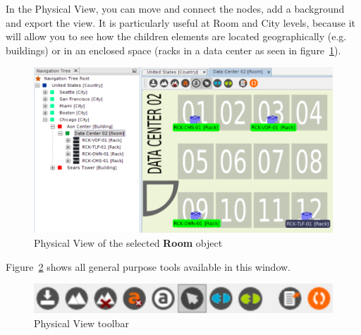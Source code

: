 \documentclass[a4paper]{article}
\begin{document}
		In the Physical View, you can move and connect the nodes, add a background and export the view. It is particularly useful at Room and City levels, because it will allow you to see how the children elements are located geographically (e.g. buildings) or in an enclosed space (racks in a data center as seen in figure~\ref{fig:room_plan}).	
		
		\begin{figure}[h!]
			\centering
			\includegraphics[width=0.8\linewidth]{img/room_plan.png}
			\caption{Physical View of the selected \textbf{Room} object}
			\label{fig:room_plan}
		\end{figure}
		
		\newpage
		Figure~\ref{fig:default_view_toolbar} shows all general purpose tools available in this window.
		\begin{figure}[h!]
			\centering
			\includegraphics[width=0.6\linewidth]{img/default_view_toolbar.png}
			\caption{Physical View toolbar}
			\label{fig:default_view_toolbar}
		\end{figure}
		
\end{document}
